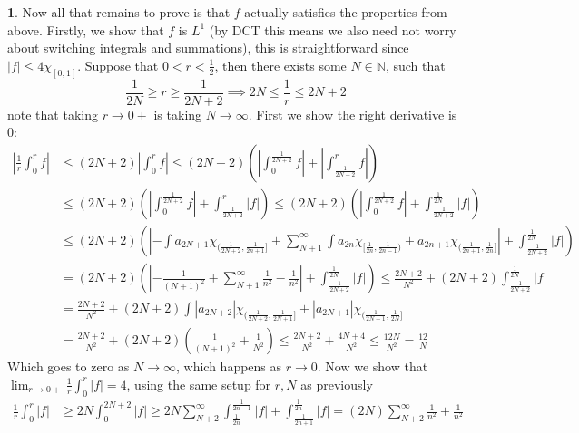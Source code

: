 \documentclass[10.5pt]{article}
\theoremstyle{definition}
\newtheorem{pb}{}
\newcommand{\abs}[1]{\left\vert#1\right\vert}
\begin{document}
\begin{pb}
        Now all that remains to prove is that \(f\) actually satisfies the properties from above.
        Firstly, we show that \(f\) is \(L^1\) (by DCT this means we also need not worry about switching integrals and summations), this is straightforward since \(\abs{f} \leq 4\chi_{[0,1]}\).        
        Suppose that
        \(0 < r < \frac12\), then there exists some \(N \in \mathbb{N}\), such that
        \[\frac{1}{2N} \geq r \geq \frac{1}{2N+2} \implies 2N \leq \frac{1}{r} \leq 2N+2\]
        note that taking \(r \to 0+\) is taking \(N \to \infty\). First we show the right derivative is \(0\):
        \begin{align*}
            \abs{\frac{1}{r}\int_0^r f} &\leq (2N+2)\abs{\int_0^r f} \leq (2N+2)\left(\abs{\int_0^{\frac{1}{2N+2}}f}+\abs{\int_{\frac{1}{2N+2}}^r f}\right) \\
            &\leq (2N+2)\left(\abs{\int_0^{\frac{1}{2N+2}}f}+\int_{\frac{1}{2N+2}}^r \abs{f}\right)
            \leq (2N+2)\left(\abs{\int_0^{\frac{1}{2N+2}}f}+\int_{\frac{1}{2N+2}}^{\frac{1}{2N}} \abs{f}\right) \\
            &\leq (2N+2)\left(\abs{-\int a_{2N+1}\chi_{(\frac{1}{2N+2},\frac{1}{2n+1}]} + \sum_{N+1}^\infty \int a_{2n} \chi_{[\frac{1}{2n},\frac{1}{2n-1})}
            + a_{2n+1}\chi_{(\frac{1}{2n+1},\frac{1}{2n}]}} + \int_{\frac{1}{2N+2}}^{\frac{1}{2N}} \abs{f}\right) \\
            &= (2N+2)\left(\abs{-\frac{1}{(N+1)^2} + \sum_{N+1}^\infty\frac{1}{n^2} - \frac{1}{n^2}}+ \int_{\frac{1}{2N+2}}^{\frac{1}{2N}} \abs{f} \right) \leq \frac{2N+2}{N^2} + (2N+2)\int_{\frac{1}{2N+2}}^{\frac{1}{2N}} \abs{f} \\
            &= \frac{2N+2}{N^2} + (2N+2)\int \abs{a_{2N+2}}\chi_{(\frac{1}{2N+2},\frac{1}{2N+1}]}+ \abs{a_{2N+1}}\chi_{(\frac{1}{2N+1},\frac{1}{2N}]} \\
            &= \frac{2N+2}{N^2} + (2N+2)(\frac{1}{(N+1)^2} + \frac{1}{N^2}) \leq \frac{2N+2}{N^2} + \frac{4N+4}{N^2} \leq \frac{12N}{N^2} = \frac{12}{N}
        \end{align*}
        Which goes to zero as \(N \to \infty\), which happens as \(r \to 0\). Now we show that
        \(\lim_{r\to0+}\frac{1}{r}\int_0^r \abs{f} = 4\), using the same setup for \(r,N\) as previously
        \begin{align*}
            \frac{1}{r}\int_0^r\abs{f} &\geq 2N\int_0^{2N+2}\abs{f} \geq 
            2N \sum_{N+2}^\infty \int_{\frac{1}{2n}}^{\frac{1}{2n-1}}\abs{f} + \int_{\frac{1}{2n+1}}^{\frac{1}{2n}} \abs{f}= (2N)\sum_{N+2}^\infty \frac{1}{n^2} + \frac{1}{n^2} \\

\end{align*}
\end{pb}
\end{document}
